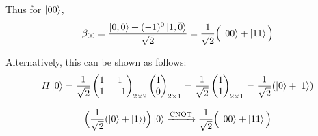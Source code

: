 \documentclass[a4paper,12pt]{article}
\begin{document}
\begin{enumerate}[label=(\alph*)]
          Thus for $\ket{00}$, \[\beta_{00} = \frac{\ket{0, 0}+(-1)^{0}\ket{1,\overline{0}}}{\sqrt{2}} = \frac{1}{\sqrt{2}}\Big(\ket{00}+ \ket{11}\Big)\]

          Alternatively, this can be shown as follows:
          \[H\ket{0} = \frac{1}{\sqrt{2}}\begin{pmatrix}1 & 1  \\
                  1 & -1\end{pmatrix}_{2 \times 2} \begin{pmatrix}1 \\
                  0\end{pmatrix}_{2 \times 1} = \frac{1}{\sqrt{2}}\begin{pmatrix}1 \\
                  1\end{pmatrix}_{2 \times 1} = \frac{1}{\sqrt{2}}( {\ket{0} + \ket{1}})\]


          \[\Big(\frac{1}{\sqrt{2}}(\ket{0}+\ket{1})\Big)\ket{0}\xrightarrow{\text{CNOT}}\frac{1}{\sqrt{2}}\Big(\ket{00}+ \ket{11}\Big)\]


\end{enumerate}
\end{document}
